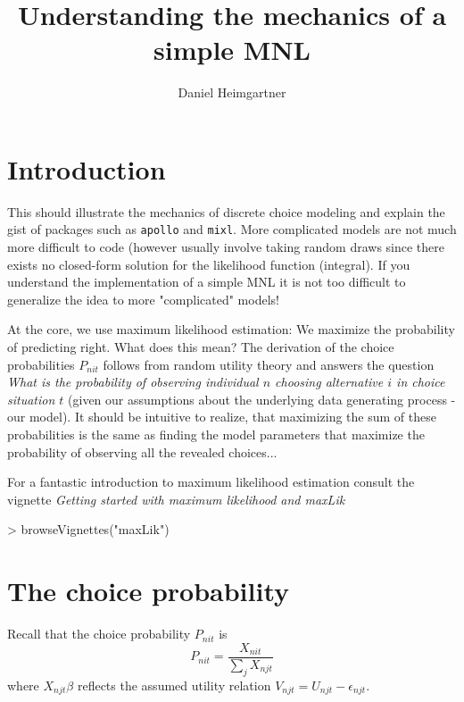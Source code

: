 \documentclass[a4paper]{article}
\begin{document}


\title{Understanding the mechanics of a simple MNL}
\author{Daniel Heimgartner}
\maketitle

\section{Introduction}

This should illustrate the mechanics of discrete choice modeling and explain the gist of packages such as \texttt{apollo} and \texttt{mixl}. More complicated models are not much more difficult to code (however usually involve taking random draws since there exists no closed-form solution for the likelihood function (integral). If you understand the implementation of a simple MNL it is not too difficult to generalize the idea to more "complicated" models!

At the core, we use maximum likelihood estimation: We maximize the probability of predicting right. What does this mean? The derivation of the choice probabilities $P_{nit}$ follows from random utility theory and answers the question \textit{What is the probability of observing individual $n$ choosing alternative $i$ in choice situation $t$} (given our assumptions about the underlying data generating process - our model). It should be intuitive to realize, that maximizing the sum of these probabilities is the same as finding the model parameters that maximize the probability of observing all the revealed choices...

For a fantastic introduction to maximum likelihood estimation consult the vignette \textit{Getting started with maximum likelihood and maxLik}

\begin{Schunk}
\begin{Sinput}
> browseVignettes("maxLik")
\end{Sinput}
\end{Schunk}

\section{The choice probability}

Recall that the choice probability $P_{nit}$ is
\begin{equation}
\label{eq:choice_probability}
P_{nit} = \frac{X_{nit}}{\sum_{j} X_{njt}}
\end{equation}
where $X_{njt}\beta$ reflects the assumed utility relation $V_{njt} = U_{njt} - \epsilon_{njt}$.
\end{document}
